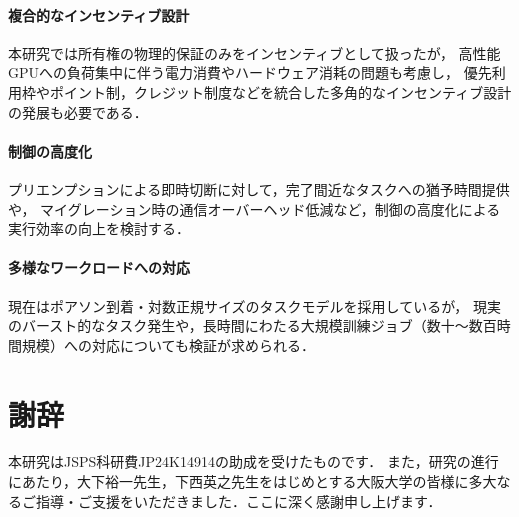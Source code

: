 \documentclass[12pt,a4paper]{jsarticle}
\begin{document}
\paragraph{複合的なインセンティブ設計}
本研究では所有権の物理的保証のみをインセンティブとして扱ったが，
高性能GPUへの負荷集中に伴う電力消費やハードウェア消耗の問題も考慮し，
優先利用枠やポイント制，クレジット制度などを統合した多角的なインセンティブ設計の発展も必要である．

\paragraph{制御の高度化}
プリエンプションによる即時切断に対して，完了間近なタスクへの猶予時間提供や，
マイグレーション時の通信オーバーヘッド低減など，制御の高度化による実行効率の向上を検討する．

\paragraph{多様なワークロードへの対応}
現在はポアソン到着・対数正規サイズのタスクモデルを採用しているが，
現実のバースト的なタスク発生や，長時間にわたる大規模訓練ジョブ（数十〜数百時間規模）への対応についても検証が求められる．

\section*{謝辞}

本研究はJSPS科研費JP24K14914の助成を受けたものです．
また，研究の進行にあたり，大下裕一先生，下西英之先生をはじめとする大阪大学の皆様に多大なるご指導・ご支援をいただきました．ここに深く感謝申し上げます．
\end{document}
